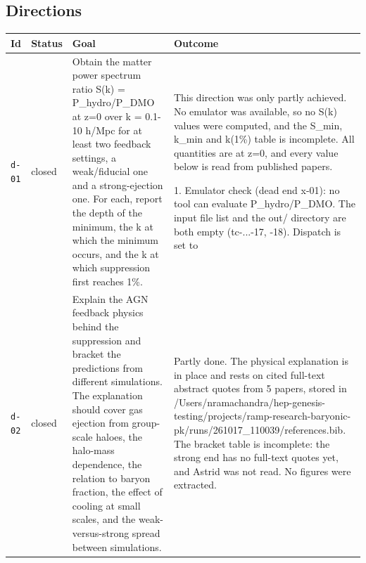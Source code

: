 \documentclass[11pt,a4paper]{article}
\begin{document}
\subsection{Directions}
\begin{longtable}{@{}p{}p{}p{}p{}@{}}
\toprule Id & Status & Goal & Outcome \\ \midrule \endhead
\texttt{d-01} & closed & Obtain the matter power spectrum ratio S(k) = P\_hydro/P\_DMO at z=0 over k = 0.1-10 h/Mpc for at least two feedback settings, a weak/fiducial one and a strong-ejection one. For each, report the depth of the minimum, the k at which the minimum occurs, and the k at which suppression first reaches 1\%. & This direction was only partly achieved. No emulator was available, so no S(k) values were computed, and the S\_min, k\_min and k(1\%) table is incomplete. All quantities are at z=0, and every value below is read from published papers.

1. Emulator check (dead end x-01): no tool can evaluate P\_hydro/P\_DMO. The input file list and the out/ directory are both empty (tc-...-17, -18). Dispatch is set to  \\
\texttt{d-02} & closed & Explain the AGN feedback physics behind the suppression and bracket the predictions from different simulations. The explanation should cover gas ejection from group-scale haloes, the halo-mass dependence, the relation to baryon fraction, the effect of cooling at small scales, and the weak-versus-strong spread between simulations. & Partly done. The physical explanation is in place and rests on cited full-text abstract quotes from 5 papers, stored in /Users/nramachandra/hep-genesis-testing/projects/ramp-research-baryonic-pk/runs/261017\_110039/references.bib. The bracket table is incomplete: the strong end has no full-text quotes yet, and Astrid was not read. No figures were extracted.


\end{longtable}
\end{document}

